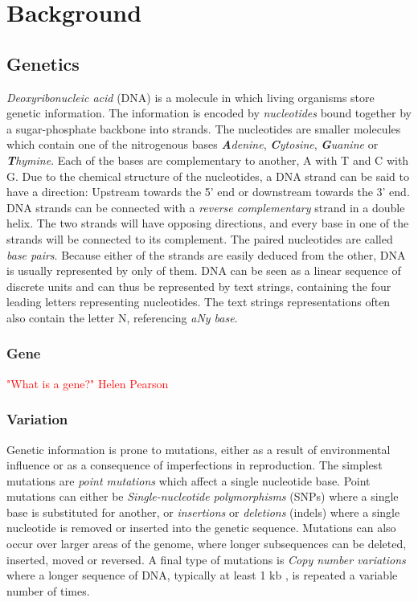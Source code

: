 \documentclass[thesis.tex]{subfiles}
\begin{document}
\chapter{Background}
\section{Genetics}
\textit{Deoxyribonucleic acid} (DNA) is a molecule in which living organisms store genetic information. The information is encoded by \textit{nucleotides} bound together by a sugar-phosphate backbone into strands. The nucleotides are smaller molecules which contain one of the nitrogenous bases \textit{\textbf{A}denine}, \textit{\textbf{C}ytosine}, \textit{\textbf{G}uanine} or \textit{\textbf{T}hymine}. Each of the bases are complementary to another, A with T and C with G. Due to the chemical structure of the nucleotides, a DNA strand can be said to have a direction: Upstream towards the 5' end or downstream towards the 3' end. DNA strands can be connected with a \textit{reverse complementary} strand in a double helix. The two strands will have opposing directions, and every base in one of the strands will be connected to its complement. The paired nucleotides are called \textit{base pairs}. Because either of the strands are easily deduced from the other, DNA is usually represented by only of them. DNA can be seen as a linear sequence of discrete units and can thus be represented by text strings, containing the four leading letters representing nucleotides. The text strings representations often also contain the letter N, referencing \textit{aNy base}.
\subsection{Gene}
\textcolor{red}{"What is a gene?" Helen Pearson}
\subsection{Variation}
Genetic information is prone to mutations, either as a result of environmental influence or as a consequence of imperfections in reproduction. The simplest mutations are \textit{point mutations} which affect a single nucleotide base. Point mutations can either be \textit{Single-nucleotide polymorphisms} (SNPs) where a single base is substituted for another, or \textit{insertions} or \textit{deletions} (indels) where a single nucleotide is removed or inserted into the genetic sequence. Mutations can also occur over larger areas of the genome, where longer subsequences can be deleted, inserted, moved or reversed. A final type of mutations is \textit{Copy number variations} where a longer sequence of DNA, typically at least 1 kb \cite{copy_number_variation_new_insights_in_genome_diversity}, is repeated a variable number of times.\\
\end{document}
